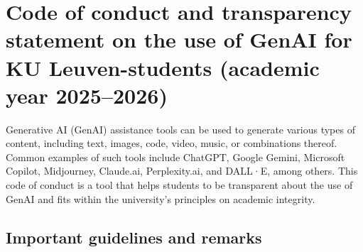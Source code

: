 \newcommand{\Cell}[1]{\begin{minipage}[t]{\linewidth}\raggedright\small #1\end{minipage}}
\setlength{\tabcolsep}{6pt}
\renewcommand{\arraystretch}{1.2}

\section*{Code of conduct and transparency statement on the use of GenAI for KU Leuven-students (academic year 2025--2026)}
Generative AI (GenAI) assistance tools can be used to generate various types of content, including text, images, code, video, music, or combinations thereof. Common examples of such tools include ChatGPT, Google Gemini, Microsoft Copilot, Midjourney, Claude.ai, Perplexity.ai, and DALL·E, among others.
\newline
\newline
This code of conduct is a tool that helps students to be transparent about the use of GenAI and fits within the university’s principles on academic integrity.

\subsection*{Important guidelines and remarks}

